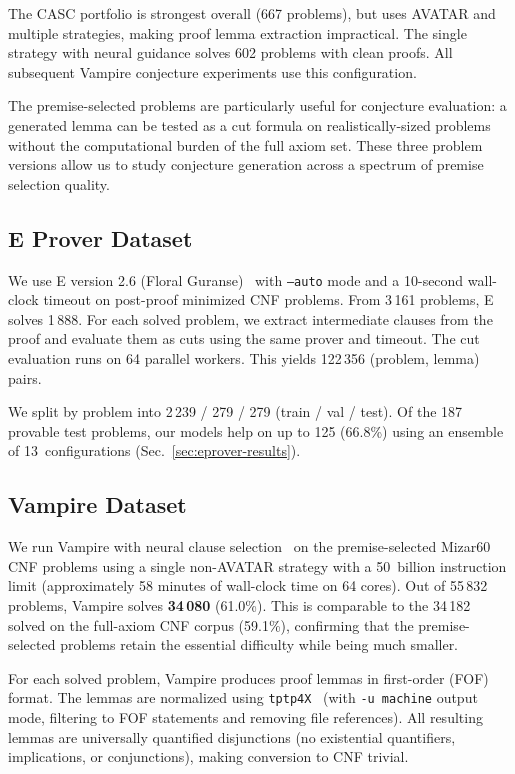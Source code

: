 \documentclass{easychair}
\newcommand{\Eprover}{E\xspace}
\newcommand{\Vampire}{Vampire\xspace}
\begin{document}
The CASC portfolio is strongest overall (667 problems), but uses
AVATAR and multiple strategies, making proof lemma extraction
impractical.  The single strategy with neural guidance solves 602
problems with clean proofs.  All subsequent \Vampire conjecture
experiments use this configuration.

The premise-selected problems are particularly useful for conjecture
evaluation: a generated lemma can be tested as a cut formula on
realistically-sized problems without the computational burden of the
full axiom set.  These three problem versions allow us to study
conjecture generation across a spectrum of premise selection quality.

\subsection{E Prover Dataset}
\label{sec:eprover-data}

We use \Eprover version 2.6 (Floral Guranse)~\cite{Schulz2002} with
\texttt{--auto} mode and a 10-second wall-clock timeout on post-proof
minimized CNF problems.  From 3\,161 problems, \Eprover solves 1\,888.
For each solved problem, we extract intermediate clauses from the proof
and evaluate them as cuts using the same prover and timeout.  The cut
evaluation runs on 64 parallel workers.
This yields 122\,356 (problem, lemma) pairs.

We split by problem into 2\,239 / 279 / 279 (train / val / test).
Of the 187 provable test problems, our models help on up to 125
(66.8\%) using an ensemble of 13~configurations
(Sec.~\ref{sec:eprover-results}).

\subsection{Vampire Dataset}
\label{sec:vampire-data}

We run \Vampire with neural clause selection~\cite{Suda2025} on
the premise-selected Mizar60 CNF problems using a single non-AVATAR
strategy with a 50~billion instruction limit (approximately 58
minutes of wall-clock time on 64 cores).  Out of 55\,832 problems,
\Vampire solves \textbf{34\,080} (61.0\%).  This is comparable to
the 34\,182 solved on the full-axiom CNF corpus (59.1\%), confirming
that the premise-selected problems retain the essential difficulty
while being much smaller.

For each solved problem, \Vampire produces proof lemmas in
first-order (FOF) format.  The lemmas are normalized using
\texttt{tptp4X}~\cite{Sutcliffe2009} (with \texttt{-u machine}
output mode, filtering to FOF statements and removing file
references).  All resulting lemmas are universally quantified
disjunctions (no existential quantifiers, implications, or
conjunctions), making conversion to CNF trivial.
\end{document}

